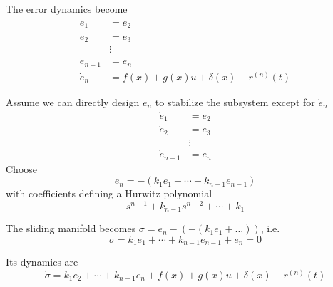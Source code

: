 The error dynamics become
\begin{equation*}
    \begin{aligned}
        \dot{e}_1     & = e_2                                   \\
        \dot{e}_2     & = e_3                                   \\
                      & \vdots                                  \\
        \dot{e}_{n-1} & = e_n                                   \\
        \dot{e}_n     & = f(x) + g(x)u + \delta(x) - r^{(n)}(t)
    \end{aligned}
\end{equation*}

Assume we can directly design $e_n$ to stabilize the subsystem except for $\dot{e}_n$
\begin{equation*}
    \begin{aligned}
        \dot{e}_1     & = e_2  \\
        \dot{e}_2     & = e_3  \\
                      & \vdots \\
        \dot{e}_{n-1} & = e_n
    \end{aligned}
\end{equation*}
\newpar{}
Choose
\begin{equation*}
    e_n = -\left(k_1e_1 + \cdots + k_{n-1}e_{n-1}\right)
\end{equation*}
with coefficients defining a Hurwitz polynomial
\begin{equation*}
    s^{n-1} + k_{n-1}s^{n-2} + \cdots + k_1
\end{equation*}
\newpar{}

The sliding manifold becomes $\sigma = e_n - (-(k_1e_1 + \dots))$, i.e.\
\begin{equation*}
    \sigma = k_1e_1 + \cdots + k_{n-1}e_{n-1} + e_n = 0
\end{equation*}

Its dynamics are
\begin{equation*}
    \dot{\sigma} = k_1e_2 + \cdots + k_{n-1}e_n + f(x) + g(x)u + \delta(x) - r^{(n)}(t)
\end{equation*}
\newpar{}

